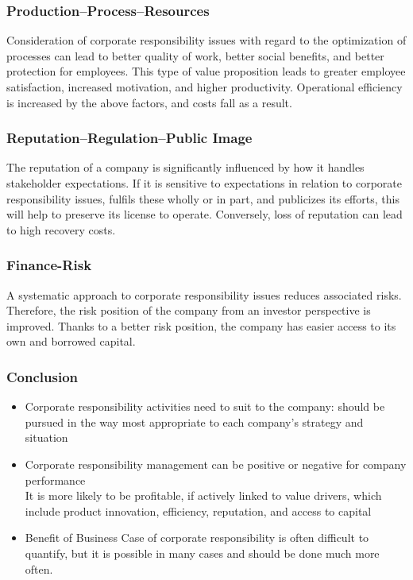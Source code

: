 \documentclass[11pt]{article}
\theoremstyle{definition}
\begin{document}
\subsubsection{Production–Process–Resources}
Consideration of corporate responsibility issues with regard to the optimization of processes can lead to better quality of work, better social benefits, and better protection for employees. This type of value proposition leads to greater employee satisfaction, increased motivation, and higher productivity. Operational efficiency is increased by the above factors, and costs fall as a result.

\subsubsection{Reputation–Regulation–Public Image}
The reputation of a company is significantly influenced by how it handles stakeholder expectations. If it is sensitive to expectations in relation to corporate responsibility issues, fulfils these wholly or in part, and publicizes its efforts, this will help to preserve its license to operate. Conversely, loss of reputation can lead to high recovery costs.

\subsubsection{Finance-Risk}
A systematic approach to corporate responsibility issues reduces associated risks. Therefore, the risk position of the company from an investor perspective is improved. Thanks to a better risk position, the company has easier access to its own and borrowed capital.

\subsubsection{Conclusion}
\begin{itemize}[label=-]
	\item Corporate responsibility activities need to suit to the company: should be pursued in the way most appropriate to each company's strategy and situation
	\item Corporate responsibility management can be positive or negative for company performance\\It is more likely to be profitable, if actively linked to value drivers, which include product innovation, efficiency, reputation, and access to capital
	\item Benefit of Business Case of corporate responsibility is often difficult to quantify, but it is possible in many cases and should be done much more often.
\end{itemize}
\end{document}
